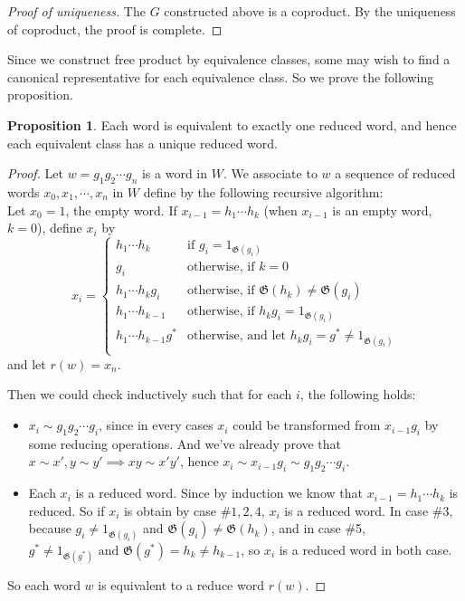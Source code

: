 \documentclass[a4paper,titlepage]{article}
\theoremstyle{remark}
\theoremstyle{definition}
\theoremstyle{theorem}
\newtheorem{proposition}{Proposition}
\newcommand{\gid}{\mathfrak{G}}
\begin{document}
  \begin{proof}[Proof of uniqueness]
    The $G$ constructed above is a coproduct. By the uniqueness of coproduct, the proof is complete.
  \end{proof}

  Since we construct free product by equivalence classes, some may wish to find a canonical
  representative for each equivalence class. So we prove the following proposition.

  \begin{proposition}
    Each word is equivalent to exactly one reduced word, and hence each equivalent class
    has a unique reduced word.
  \end{proposition}

  \begin{proof}
    Let $w = g_1 g_2 \cdots g_n$ is a word in $W$. We associate to $w$ a sequence of reduced words
    $x_0, x_1, \cdots, x_n$ in $W$ define by the following recursive algorithm: \\
    Let $x_0 = 1$, the empty word. If $x_{i-1} = h_1 \cdots h_k$ (when $x_{i-1}$ is an empty word, $k = 0$),
    define $x_i$ by
    \[
      x_i = \begin{cases}
        h_1 \cdots h_k & \text{if } g_i = 1_{\gid(g_i)} \\
        g_i & \text{otherwise, if } k = 0 \\
        h_1 \cdots h_k g_i & \text{otherwise, if } \gid(h_k) \neq \gid(g_i) \\
        h_1 \cdots h_{k-1} & \text{otherwise, if } h_k g_i = 1_{\gid(g_i)} \\
        h_1 \cdots h_{k-1} g^* & \text{otherwise, and let } h_k g_i = g^* \neq 1_{\gid(g_i)} \\
      \end{cases}
    \]
    and let $r(w) = x_n$.

    Then we could check inductively such that for each $i$, the following holds:
    \begin{itemize}
      \item $x_i \sim g_1 g_2 \cdots g_i$, since in every cases $x_i$ could be transformed from $x_{i-1} g_i$
        by some reducing operations. And we've already prove that $x \sim x', y \sim y' \implies xy \sim x'y'$,
        hence $x_i \sim x_{i-1} g_i \sim g_1 g_2 \cdots g_i$.
      \item Each $x_i$ is a reduced word. Since by induction we know that $x_{i-1} = h_1 \cdots h_k$ is reduced. 
        So if $x_i$ is obtain by case \#$1, 2, 4$, $x_i$ is a reduced word. In case \#3, because $g_i \neq 1_{\gid(g_i)}$
        and $\gid(g_i) \neq \gid(h_k)$, and in case \#5, $g^* \neq 1_{\gid(g^*)} \text{ and } \gid(g^*) = h_k \neq h_{k-1}$,
        so $x_i$ is a reduced word in both case.
    \end{itemize}
    So each word $w$ is equivalent to a reduce word $r(w)$.


\end{proof}
\end{document}
